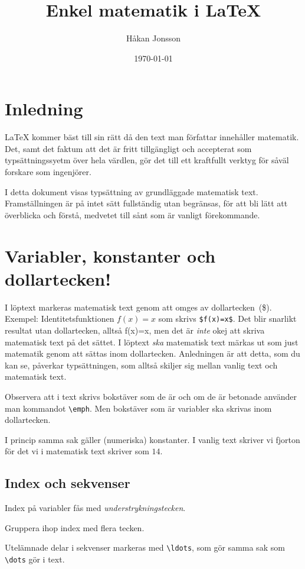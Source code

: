 \documentclass[12pt]{article}
\title{Enkel matematik i LaTeX}
\author{Håkan Jonsson}
\date{\today}
\begin{document}
\maketitle

\section{Inledning}
LaTeX kommer bäst till sin rätt då den text man författar innehåller
matematik. Det, samt det faktum att det är fritt tillgängligt och
accepterat som typsättningssyetm över hela värdlen, gör det till ett
kraftfullt verktyg för såväl forskare som ingenjörer. 

I detta dokument visas typsättning av grundläggade matematisk
text. Framställningen är på intet sätt fullständig utan begränsas, för
att bli lätt att överblicka och förstå, medvetet till sånt som är
vanligt förekommande.  

\section{Variabler, konstanter och dollartecken!}

I löptext markeras matematisk text genom att omges av
dollartecken~(\$). Exempel: Identitetsfunktionen $f(x)=x$ som skrivs
\verb|$f(x)=x$|. Det blir snarlikt resultat utan
dollartecken, alltså f(x)=x, men det är \emph{inte} okej att
skriva matematisk text på det sättet. I löptext \emph{ska} matematisk
text märkas ut som just matematik genom att sättas inom
dollartecken. Anledningen är att detta, som du kan se, påverkar
typsättningen, som alltså skiljer sig mellan vanlig text och
matematisk text. 

Observera att i text skrivs bokstäver som de är och om de är betonade
använder man kommandot \verb|\emph|. Men bokstäver som är variabler
ska skrivas inom dollartecken. 

I princip samma sak gäller (numeriska) konstanter. I vanlig text
skriver vi fjorton för det vi i matematisk text skriver som $14$. 

\subsection{Index och sekvenser}

Index på variabler fås med \emph{understrykningstecken}. 

Gruppera ihop index med flera tecken. 

Utelämnade delar i sekvenser markeras med \verb|\ldots|, som gör samma
sak som \verb|\dots| gör i text. 
\end{document}
